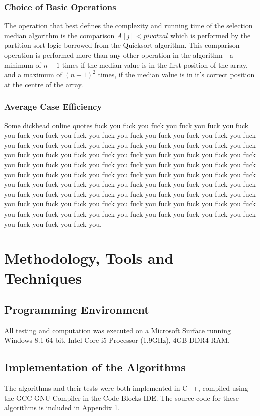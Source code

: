 \documentclass{article}
\begin{document}
        \subsubsection{Choice of Basic Operations}
            The operation that best defines the complexity and running time of the selection median algorithm is the comparison $A[j] < pivotval$ which is performed by the partition sort logic borrowed from the Quicksort algorithm. This comparison operation is performed more than any other operation in the algorithm - a minimum of $n - 1$ times if the median value is in the first position of the array, and a maximum of $(n - 1)^2$ times, if the median value is in it's correct position at the centre of the array.

        \subsubsection{Average Case Efficiency}
            Some dickhead online quotes fuck you fuck you fuck you fuck you fuck you fuck you fuck you fuck you fuck you fuck you fuck you fuck you fuck you fuck you fuck you fuck you fuck you fuck you fuck you fuck you fuck you fuck you fuck you fuck you fuck you fuck you fuck you fuck you fuck you fuck you fuck you fuck you fuck you fuck you fuck you fuck you fuck you fuck you fuck you fuck you fuck you fuck you fuck you fuck you fuck you fuck you fuck you fuck you fuck you fuck you fuck you fuck you fuck you fuck you fuck you fuck you fuck you fuck you fuck you fuck you fuck you fuck you fuck you fuck you fuck you fuck you fuck you fuck you fuck you fuck you fuck you fuck you fuck you fuck you fuck you fuck you fuck you fuck you fuck you fuck you fuck you fuck you fuck you fuck you fuck you fuck you fuck you fuck you fuck you fuck you.

\section{Methodology, Tools and Techniques}
    \subsection{Programming Environment}
        All testing and computation was executed on a Microsoft Surface running Windows 8.1 64 bit, Intel Core i5 Processor (1.9GHz), 4GB DDR4 RAM.
        \subsection{Implementation of the Algorithms}
        The algorithms and their tests were both implemented in C++, compiled using the GCC GNU Compiler in the Code Blocks IDE. The source code for these algorithms is included in Appendix 1.
\end{document}
